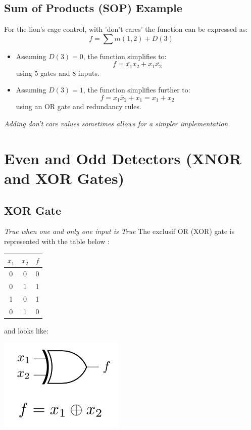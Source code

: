 \documentclass[12pt,openany, tikz,border=10pt]{book}
\begin{document}
\subsection{Sum of Products (SOP) Example}
For the lion's cage control, with 'don't cares' the function can be expressed as:
\[ f = \sum m(1,2) + D(3) \]

\begin{itemize}
    \item Assuming \( D(3) = 0 \), the function simplifies to:
    \[ f = \overline{x_1} x_2 + x_1 \overline{x_2} \]
    using 5 gates and 8 inputs.
    \item Assuming \( D(3) = 1 \), the function simplifies further to:
    \[ f = x_1 \bar{x}_2 + x_1 = x_1 + x_2 \]
    using an OR gate and redundancy rules.
\end{itemize}

\textit{Adding don't care values sometimes allows for a simpler implementation.}
\section{Even and Odd Detectors (XNOR and XOR Gates)}
\subsection{XOR Gate}
\textit{True when one and only one input is True}
The exclusif OR (XOR) gate is represented with the table below :
\begin{table}[h]
    \centering
    \begin{tabular}{|c|c|c|}
    \hline
    \( x_1 \) & \( x_2 \) & \( f \) \\
    \hline
    0 & 0 & 0 \\
 0 & 1 & 1 \\
    1 & 0 & 1 \\
    0 & 1 & 0 \\
    \hline
    \end{tabular}
    \end{table}

and looks like:
\vspace*{-10px}
\begin{center}
    \begin{minipage}[c]{0.45\textwidth} %
        \centering
        \includegraphics[width=0.45\textwidth]{circuits/6.11.1.png} %
    \end{minipage}
\end{center}
\end{document}
